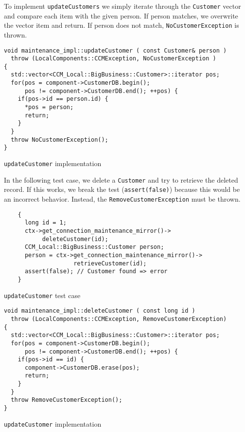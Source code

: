 \newpage
To implement {\tt updateCustomers} we simply iterate through the {\tt Customer}
vector and compare each item with the given person.
If person matches, we overwrite the vector item and return.
If person does not match, {\tt NoCustomerException} is thrown.

\begin{Example}
\begin{minifbox}
\begin{small}
\begin{verbatim}
void maintenance_impl::updateCustomer ( const Customer& person )
  throw (LocalComponents::CCMException, NoCustomerException )
{
  std::vector<CCM_Local::BigBusiness::Customer>::iterator pos;
  for(pos = component->CustomerDB.begin(); 
      pos != component->CustomerDB.end(); ++pos) {
    if(pos->id == person.id) {
      *pos = person;
      return;
    }
  }
  throw NoCustomerException();  
}
\end{verbatim}
\end{small}
\end{minifbox}
\caption{{\tt updateCustomer} implementation}
\label{example:}
\end{Example}




In the following test case, we delete a {\tt Customer} and try to retrieve the 
deleted record.
If this works, we break the test ({\tt assert(false)}) because this would be an
incorrect behavior. 
Instead, the {\tt RemoveCustomerException} must be thrown.
\begin{Example}
\begin{minifbox}
\begin{small}
\begin{verbatim}
    {
      long id = 1;
      ctx->get_connection_maintenance_mirror()->
           deleteCustomer(id);
      CCM_Local::BigBusiness::Customer person;
      person = ctx->get_connection_maintenance_mirror()->
                    retrieveCustomer(id);
      assert(false); // Customer found => error
    }
\end{verbatim}
\end{small}
\end{minifbox}
\caption{{\tt updateCustomer} test case}
\label{example:}
\end{Example}


\begin{Example}
\begin{minifbox}
\begin{small}
\begin{verbatim}
void maintenance_impl::deleteCustomer ( const long id )
  throw (LocalComponents::CCMException, RemoveCustomerException)
{
  std::vector<CCM_Local::BigBusiness::Customer>::iterator pos;
  for(pos = component->CustomerDB.begin(); 
      pos != component->CustomerDB.end(); ++pos) {
    if(pos->id == id) {
      component->CustomerDB.erase(pos);
      return;
    }
  }
  throw RemoveCustomerException();  
}
\end{verbatim}
\end{small}
\end{minifbox}
\caption{{\tt updateCustomer} implementation}
\label{example:updateCustomer}
\end{Example}

